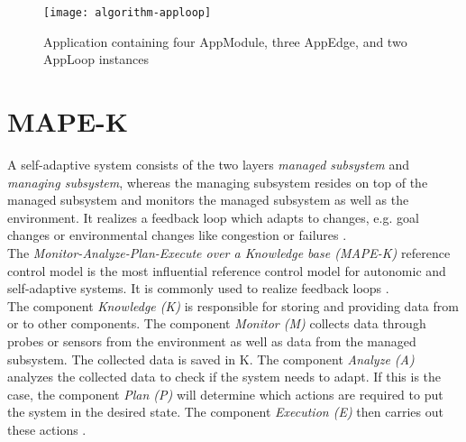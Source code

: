 \begin{figure}[htb]
    \centering
    \texttt{[image: algorithm-apploop]}
    \caption{Application containing four AppModule, three AppEdge, and two \mbox{AppLoop} instances}
    \label{fig:apploop}
\end{figure}

\section{MAPE-K}
A self-adaptive system consists of the two layers \textit{managed subsystem} and \textit{managing subsystem}, whereas the managing subsystem resides on top of the managed subsystem and monitors the managed subsystem as well as the environment.
It realizes a feedback loop which adapts to changes, e.g. goal changes or environmental changes like congestion or failures \cite{mape-k}.\\

The \textit{Monitor-Analyze-Plan-Execute over a Knowledge base (MAPE-K)} \cite{autonomic-computing} reference control model is the most influential reference control model for autonomic and self-adaptive systems.
It is commonly used to realize feedback loops \cite{mape-k}.\\

The component \textit{Knowledge (K)} is responsible for storing and providing data from or to other components.
The component \textit{Monitor (M)} collects data through probes or sensors from the environment as well as data from the managed subsystem.
The collected data is saved in K.
The component \textit{Analyze (A)} analyzes the collected data to check if the system needs to adapt.
If this is the case, the component \textit{Plan (P)} will determine which actions are required to put the system in the desired state.
The component \textit{Execution (E)} then carries out these actions \cite{mape-k}.